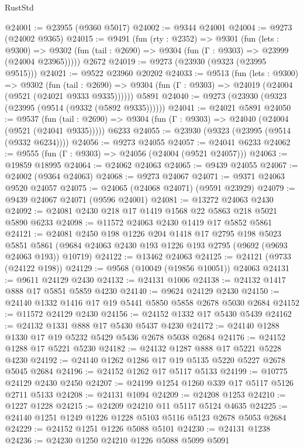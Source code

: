 \begin{lexlean}{RustStd}
\begin{coremodule}
@24001 := @23955 (@9360 @5017)
@24002 := @9344 @24001
@24004 := @9273 (@24002 @9365)
@24015 := @9491
    (fun (rty : @2352) =>
    @9301
      (fun (lets : @9300) =>
      @9302 (fun (tail : @2690) => @9304 (fun (Γ : @9303) => @23999 (@24004 @23965)))))
    @2672
@24019 := @9273 (@23930 (@9323 (@23995 @9515)))
@24021 := @9522 @23960 @20202
@24033 := @9513
    (fun (lets : @9300) =>
    @9302
      (fun (tail : @2690) =>
      @9304 (fun (Γ : @9303) => @24019 (@24004 (@9521 (@24021 @9333 @9335))))))
    @5891
@24040 := @9273 (@23930 (@9323 (@23995 (@9514 (@9332 (@5892 @9335))))))
@24041 := @24021 @5891
@24050 := @9537
    (fun (tail : @2690) => @9304 (fun (Γ : @9303) => @24040 (@24004 (@9521 (@24041 @9335)))))
    @6233
@24055 := @23930 (@9323 (@23995 (@9514 (@9332 @6234))))
@24056 := @9273 @24055
@24057 := @24041 @6233
@24062 := @9555 (fun (Γ : @9303) => @24056 (@24004 (@9521 @24057)))
@24063 := @19859 @18995
@24064 := @24062 @24063
@24065 := @9439 @24055
@24067 := @24002 (@9364 @24063)
@24068 := @9273 @24067
@24071 := @9371 @24063 @9520 @24057
@24075 := @24065 (@24068 @24071) (@9591 @23929)
@24079 := @9439 @24067 @24071 (@9596 @24001)
@24081 := @13272 @24063 @2430
@24092 := @24081 @2430 @218 @17 @1419 @1568 @22 @5863 @218 @5021 @5890 @6233
@24098 := @11572 @24063 @2430 @1419 @17 @5852 @5861
@24121 := @24081
    @2450
    @198
    @1226
    @204
    @1418
    @17
    @2795
    @198
    @5023
    @5851
    @5861
    (@9684 @24063 @2430 @193 @1226 @193 @2795 (@9692 (@9693 @24063 @193)) @10719)
@24122 := @13462 @24063
@24125 := @24121 (@9733 (@24122 @198))
@24129 := @9568 (@10049 (@19856 @10051)) @24063
@24131 := @9611 @24129 @2430
@24132 := @24131 @1006
@24138 := @24132 @1417 @888 @17 @5851 @5859 @4230
@24140 := @9624 @24129 @2430
@24150 := @24140 @1332 @1416 @17 @19 @5441 @5850 @5858 @2678 @5030 @2684
@24152 := @11572 @24129 @2430
@24156 := @24152 @1332 @17 @5430 @5439
@24162 := @24132 @1331 @888 @17 @5430 @5437 @4230
@24172 := @24140 @1288 @1330 @17 @19 @5232 @5429 @5436 @2678 @5038 @2684
@24176 := @24152 @1288 @17 @5221 @5230
@24182 := @24132 @1287 @888 @17 @5221 @5228 @4230
@24192 := @24140 @1262 @1286 @17 @19 @5135 @5220 @5227 @2678 @5045 @2684
@24196 := @24152 @1262 @17 @5117 @5133
@24199 := @10775 @24129 @2430 @2450
@24207 := @24199 @1254 @1260 @339 @17 @5117 @5126 @2711 @5133
@24208 := @24131 @1094
@24209 := @24208 @1253
@24210 := @1227 @1228
@24215 := @24209 @24210 @11 @5117 @5124 @4635
@24225 := @24140 @1251 @1249 @1226 @1228 @5103 @5116 @5123 @2678 @5053 @2684
@24229 := @24152 @1251 @1226 @5088 @5101
@24230 := @24131 @1238
@24236 := @24230 @1250 @24210 @1226 @5088 @5099 @5091

\end{coremodule}
\end{lexlean}
